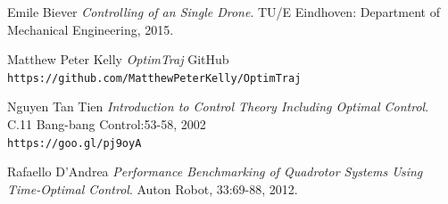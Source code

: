 \documentclass[12pt]{article}
\begin{document}
	\begin{thebibliography}{9}
		
		
		Emile Biever
		\textit{Controlling of an Single Drone}.
		TU/E Eindhoven: Department of Mechanical Engineering, 2015.
		
		
		
		Matthew Peter Kelly
		\textit{OptimTraj}
		GitHub
		\\\texttt{https://github.com/MatthewPeterKelly/OptimTraj}
		
		
		Nguyen Tan Tien
		\textit{Introduction to Control Theory Including Optimal Control}.
		C.11 Bang-bang Control:53-58, 2002
		\\\texttt{https://goo.gl/pj9oyA}
		
		
		
		Rafaello D'Andrea
		\textit{Performance Benchmarking of Quadrotor Systems Using Time-Optimal Control}.
		Auton Robot, 33:69-88, 2012.
		
		
		
		
		
		
		
		
		
		
		
		
		
		
		
	\end{thebibliography}
	
	
\end{document}
